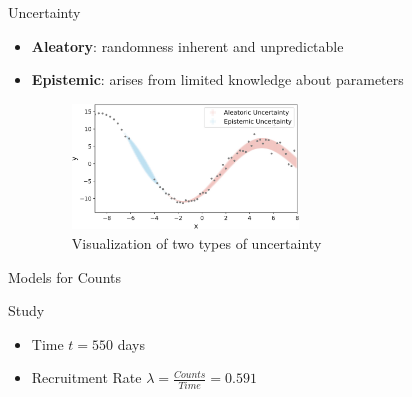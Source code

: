\documentclass[english]{beamer}\usepackage[]{graphicx}\usepackage[]{xcolor}
\begin{document}
\begin{frame}{Uncertainty}

\begin{itemize}
\item \textbf{Aleatory}: randomness inherent and unpredictable
\item \textbf{Epistemic}: arises from limited knowledge about parameters

\begin{figure}[h]
    \centering
    \includegraphics[width=60mm,scale=0.7]{illustration_uncertainty.png}
    \caption{Visualization of two types of uncertainty \citep{yang2023explainable}}
    \label{fig:uncertainty}
\end{figure}


\end{itemize}


\end{frame}

\begin{frame}{Models for Counts}

\begin{table}[h!]
\centering
{}
\caption{Aleatory and epistemic uncertainty in accrual shown by different models for counts.}
\label{tab:count_modeling}
\end{table}

\end{frame}

\begin{frame}{Study}

\begin{itemize}
\item Time $t = 550$ days
\item Recruitment Rate $\lambda = \frac{Counts}{Time} = 0.591$
\end{itemize}

\end{frame}
\end{document}
